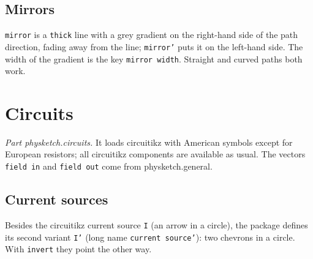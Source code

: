 \documentclass[a4paper,11pt]{article}
\newcommand\pkg[1]{\textsf{#1}}
\newcommand\key[1]{\texttt{#1}}
\begin{document}
\subsection{Mirrors}
\key{mirror} is a \key{thick} line with a grey gradient on the right-hand
side of the path direction, fading away from the line; \key{mirror'} puts it
on the left-hand side. The width of the gradient is the key \key{mirror
width}. Straight and curved paths both work.
\begin{example}
\end{example}

\section{Circuits}
\emph{Part \pkg{physketch.circuits}.} It loads \pkg{circuitikz} with
American symbols except for European resistors; all \pkg{circuitikz}
components are available as usual. The vectors \texttt{field in} and
\texttt{field out} come from \pkg{physketch.general}.
\begin{example}
\end{example}

\subsection{Current sources}
Besides the \pkg{circuitikz} current source \key{I} (an arrow in a circle),
the package defines its second variant \key{I'} (long name \key{current
source'}): two chevrons in a circle. With \key{invert} they point the other
way.
\begin{example}
\end{example}
\end{document}
